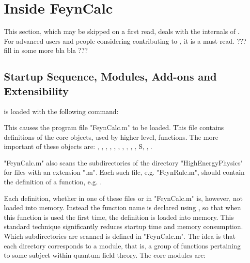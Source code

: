 \section{Inside FeynCalc}
\label{inside}

This section, which may be skipped on a first read, deals with the internals of \fc. For advanced users and people considering contributing to \fc, it is a must-read. ??? fill in some more bla bla ???

\subsection{Startup Sequence, Modules, Add-ons and Extensibility}
\label{modules}

\fc is loaded with the following command:


This causes the program file "FeynCalc.m" to be loaded. This file contains definitions of the core objects, used by higher level, functions. The more important of these objects are: , , , , , , , , , , S, , .

"FeynCalc.m" also scans the subdirectories of the directory "HighEnergyPhysics" for files with an extension ".m". Each such file, e.g. "FeynRule.m", should contain the definition of a function, e.g. . 

Each definition, whether in one of these files or in "FeynCalc.m" is, however, not loaded into memory. Instead the function name is declared using , so that when this function is used the first time, the definition is loaded into memory. This standard technique significantly reduces startup time and memory consumption. Which subdirectories are scanned is defined in "FeynCalc.m". The idea is that each directory corresponds to a module, that is, a group of functions pertaining to some subject within quantum field theory. The core modules are:

